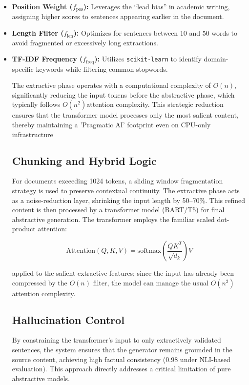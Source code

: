\documentclass[conference]{IEEEtran}
\begin{document}
\begin{itemize}

\item \textbf{Position Weight ($f_{\text{pos}}$):} 
Leverages the ``lead bias''\cite{8} in academic writing, assigning higher scores to sentences appearing earlier in the document.

\item \textbf{Length Filter ($f_{\text{len}}$):} 
Optimizes for sentences between 10 and 50 words to avoid fragmented or excessively long extractions\cite{8}.

\item \textbf{TF-IDF Frequency ($f_{\text{freq}}$):} 
Utilizes \texttt{scikit-learn}\cite{15} to identify domain-specific keywords while filtering common stopwords.


The extractive phase operates with a computational complexity of $O(n)$, significantly reducing the input tokens before the abstractive phase, which typically follows $O(n^2)$attention complexity. This strategic reduction ensures that the transformer model processes only the most salient content, thereby maintaining a 'Pragmatic AI' footprint even on CPU-only infrastructure


\subsection{Chunking and Hybrid Logic}

For documents exceeding 1024 tokens, a sliding window fragmentation strategy is used to preserve contextual continuity\cite{5}. The extractive phase acts as a noise-reduction layer\cite{8}, shrinking the input length by 50--70\%. This refined content is then processed by a transformer model (BART/T5)\cite{2, 4} for final abstractive generation. The transformer employs the familiar scaled dot-product attention:

\[
\text{Attention}(Q,K,V)=\text{softmax}\left(\frac{QK^{T}}{\sqrt{d_k}}\right)V
\]

applied to the salient extractive features; since the input has already been compressed by the $O(n)$ filter, the model can manage the usual $O(n^{2})$ attention complexity.

\subsection{Hallucination Control}

By constraining the transformer's input to only extractively validated sentences, the system ensures that the generator remains grounded in the source content\cite{14}, achieving high factual consistency (0.98 under NLI-based evaluation). This approach directly addresses a critical limitation of pure abstractive models\cite{14}.


\end{itemize}
\end{document}
